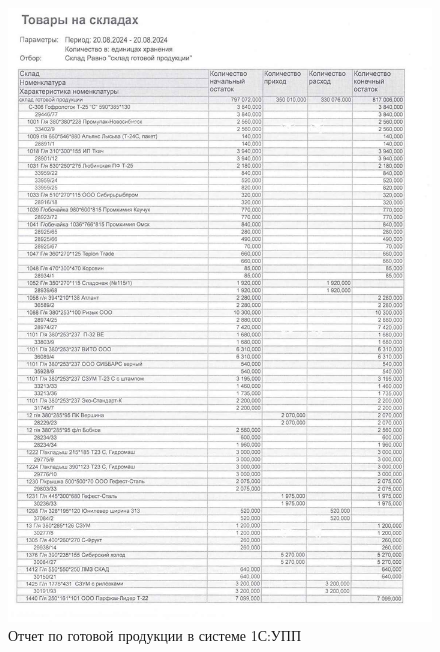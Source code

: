 \begin{figure}
\begin{center}
  \includegraphics[height=0.94\textheight, width=\textwidth, keepaspectratio]{Pics/d31.jpg}
\end{center}
  \caption{Отчет по готовой продукции в системе 1С:УПП}
  \label{pic:d31}
\end{figure}




